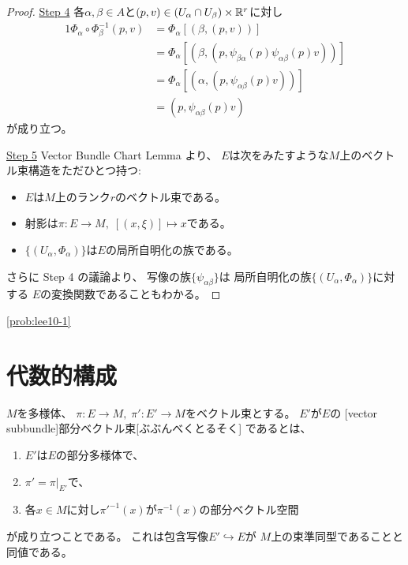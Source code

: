 \documentclass[report]{jlreq}
\begin{document}
\begin{proof}
    \underline{Step 4} \quad
    各$\alpha, \beta \in A$と$(p, v) \in (U_\alpha \cap U_\beta) \times \mathbb{R}^r$に対し
    \begin{alignat}{1}
        \Phi_\alpha \circ \Phi_\beta^{-1}(p, v)
            &= \Phi_\alpha [(\beta, (p, v))] \\
            &= \Phi_\alpha [(\beta,
                (p, \psi_{\beta\alpha}(p) \psi_{\alpha\beta} (p) v))] \\
            &= \Phi_\alpha [(\alpha,
                (p, \psi_{\alpha\beta}(p) v))] \\
            &= (p, \psi_{\alpha\beta}(p) v)
    \end{alignat}
    が成り立つ。

    \underline{Step 5} \quad
    Vector Bundle Chart Lemma より、
    $E$は次をみたすような$M$上のベクトル束構造をただひとつ持つ:
    \begin{itemize}
        \item $E$は$M$上のランク$r$のベクトル束である。
        \item 射影は$\pi \colon E \to M, \; [(x, \xi)] \mapsto x$である。
        \item $\{(U_\alpha, \Phi_\alpha)\}$は$E$の局所自明化の族である。
    \end{itemize}
    さらに Step 4 の議論より、
    {\smooth}写像の族$\{ \psi_{\alpha\beta} \}$は
    局所自明化の族$\{ (U_\alpha, \Phi_\alpha) \}$に対する
    $E$の変換関数であることもわかる。
\end{proof}

\begin{example}
    \cref{prob:lee10-1}
\end{example}

%
\section{代数的構成}


\begin{definition}[部分ベクトル束]
    $M$を多様体、
    $\pi \colon E \to M,\; \pi' \colon E' \to M$をベクトル束とする。
    $E'$が$E$の
    [vector subbundle]{部分ベクトル束}[ぶぶんべくとるそく]
    であるとは、
    \begin{enumerate}
        \item $E'$は$E$の部分多様体で、
        \item $\pi' = \pi|_{E'}$で、
        \item 各$x \in M$に対し$\pi'^{-1}(x)$が$\pi^{-1}(x)$の部分ベクトル空間
    \end{enumerate}
    が成り立つことである。
    これは包含写像$E' \hookrightarrow E$が
    $M$上の束準同型であることと同値である。
\end{definition}
\end{document}
